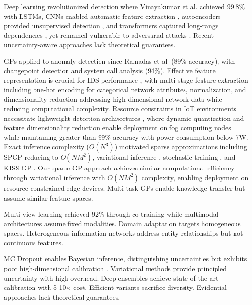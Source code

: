 \documentclass[review,12pt]{elsarticle}
\begin{document}
Deep learning revolutionized detection where Vinayakumar et al. \cite{vinayakumar2019deep} achieved 99.8\% with LSTMs, CNNs enabled automatic feature extraction \cite{zhang2019deep}, autoencoders provided unsupervised detection \cite{mirsky2018kitsune}, and transformers captured long-range dependencies \cite{wu2022rtids}, yet remained vulnerable to adversarial attacks \cite{carlini2017towards}. Recent uncertainty-aware approaches \cite{sensoy2018evidential,malinin2018predictive} lack theoretical guarantees.

GPs applied to anomaly detection since Ramadas et al. \cite{ramadas2003detecting} (89\% accuracy), with changepoint detection \cite{roberts2013gaussian} and system call analysis \cite{kim2004gaussian} (94\%). Effective feature representation is crucial for IDS performance \cite{ahmad2023effective}, with multi-stage feature extraction including one-hot encoding for categorical network attributes, normalization, and dimensionality reduction addressing high-dimensional network data while reducing computational complexity. Resource constraints in IoT environments necessitate lightweight detection architectures \cite{alahmadi2024lightweight}, where dynamic quantization and feature dimensionality reduction enable deployment on fog computing nodes while maintaining greater than 99\% accuracy with power consumption below 7W. Exact inference complexity ($O(N^3)$) motivated sparse approximations including SPGP \cite{snelson2006sparse} reducing to $O(NM^2)$, variational inference \cite{titsias2009variational}, stochastic training \cite{hensman2013gaussian}, and KISS-GP \cite{wilson2015kernel}. Our sparse GP approach achieves similar computational efficiency through variational inference with $O(NM^2)$ complexity, enabling deployment on resource-constrained edge devices. Multi-task GPs \cite{bonilla2008multi,alvarez2011computationally,moreno2018heterogeneous} enable knowledge transfer but assume similar feature spaces.

Multi-view learning \cite{xu2013survey,sun2013survey} achieved 92\% through co-training while multimodal architectures \cite{baltrusaitis2019multimodal} assume fixed modalities. Domain adaptation \cite{pan2010survey,ganin2016domain,sun2016deep,tzeng2014deep} targets homogeneous spaces. Heterogeneous information networks \cite{shi2017survey,zhang2019heterogeneous,fu2020magnn} address entity relationships but not continuous features.

MC Dropout \cite{gal2016dropout} enables Bayesian inference, distinguishing uncertainties \cite{kendall2017uncertainties} but exhibits poor high-dimensional calibration \cite{foong2019between}. Variational methods \cite{blundell2015weight} provide principled uncertainty with high overhead. Deep ensembles \cite{lakshminarayanan2017simple} achieve state-of-the-art calibration \cite{ovadia2019trust} with 5-10× cost. Efficient variants \cite{wen2020batchensemble,havasi2021training} sacrifice diversity. Evidential approaches \cite{sensoy2018evidential,amini2020deep,charpentier2020posterior} lack theoretical guarantees.
\end{document}
